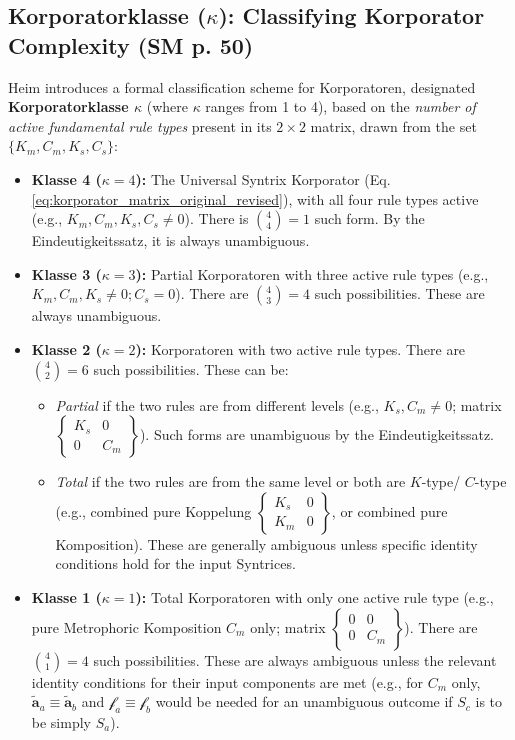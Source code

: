 \documentclass[
    12pt,              %
    a4paper,           %
    headings=normal,   %
    twoside=true,      %
    BCOR=8mm,          %
]{scrbook}
\newcommand{\metrophor}{\bm{\widetilde{a}}}
\newcommand{\synkolator}{\mathcal{f}}
\begin{document}
\subsection{Korporatorklasse (\(\kappa\)): Classifying Korporator Complexity (SM p. 50)}
\label{sec:ch3_korporatorklasse} 

Heim introduces a formal classification scheme for Korporatoren, designated \textbf{Korporatorklasse \(\kappa\)} (where \(\kappa\) ranges from 1 to 4), based on the \textit{number of active fundamental rule types} present in its \(2 \times 2\) matrix, drawn from the set \(\{K_m, C_m, K_s, C_s\}\):

\begin{itemize}
    \item   \textbf{Klasse 4 (\(\kappa=4\)):} The Universal Syntrix Korporator (Eq. \eqref{eq:korporator_matrix_original_revised}), with all four rule types active (e.g., \(K_m, C_m, K_s, C_s \neq 0\)). There is \(\binom{4}{4}=1\) such form. By the Eindeutigkeitssatz, it is always unambiguous.
    \item   \textbf{Klasse 3 (\(\kappa=3\)):} Partial Korporatoren with three active rule types (e.g., \(K_m, C_m, K_s \neq 0; C_s = 0\)). There are \(\binom{4}{3}=4\) such possibilities. These are always unambiguous.
    \item   \textbf{Klasse 2 (\(\kappa=2\)):} Korporatoren with two active rule types. There are \(\binom{4}{2}=6\) such possibilities. These can be:
        \begin{itemize}
            \item   \textit{Partial} if the two rules are from different levels (e.g., \(K_s, C_m \neq 0\); matrix \( \begin{Bmatrix} K_s & 0 \\ 0 & C_m \end{Bmatrix} \)). Such forms are unambiguous by the Eindeutigkeitssatz.
            \item   \textit{Total} if the two rules are from the same level or both are \(K\)-type/ \(C\)-type (e.g., combined pure Koppelung \( \begin{Bmatrix} K_s & 0 \\ K_m & 0 \end{Bmatrix} \), or combined pure Komposition). These are generally ambiguous unless specific identity conditions hold for the input Syntrices.
        \end{itemize}
    \item   \textbf{Klasse 1 (\(\kappa=1\)):} Total Korporatoren with only one active rule type (e.g., pure Metrophoric Komposition \(C_m\) only; matrix \( \begin{Bmatrix} 0 & 0 \\ 0 & C_m \end{Bmatrix} \)). There are \(\binom{4}{1}=4\) such possibilities. These are always ambiguous unless the relevant identity conditions for their input components are met (e.g., for \(C_m\) only, \(\metrophor_a \equiv \metrophor_b\) and \(\synkolator_a \equiv \synkolator_b\) would be needed for an unambiguous outcome if \(S_c\) is to be simply \(S_a\)).
\end{itemize}
\end{document}
